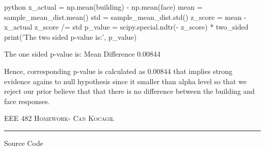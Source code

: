 \documentclass[12pt]{amsart}
\makeatletter
\def\section{\@startsection{section}{1}%
  \z@{.7\linespacing\@plus\linespacing}{.5\linespacing}%
  {\normalfont\scshape}}%
\makeatother
\begin{document}
\begin{mintedbox}{python}
x_actual = np.mean(building) - np.mean(face)
mean = sample_mean_dist.mean()
std = sample_mean_dist.std()
z_score = mean - x_actual
z_score /= std
p_value = scipy.special.ndtr(- z_score) * two_sided
print('The two sided p-value is:', p_value)
\end{mintedbox}

The one sided p-value is: Mean Difference    0.00844

\bigskip

Hence, corresponding p-value is calculated as 0.00844 that implies strong evidence agains to null hypothesis since it smaller than alpha level so that we reject our prior believe that that there is no difference between the building and face responses.

\newpage
{\scshape EEE 482} \hfill {\scshape \large  Homework-\relax} \hfill {\scshape Can Kocagil}
\smallskip
\hrule
\vspace{2mm}

\section{Source Code}
\end{document}
